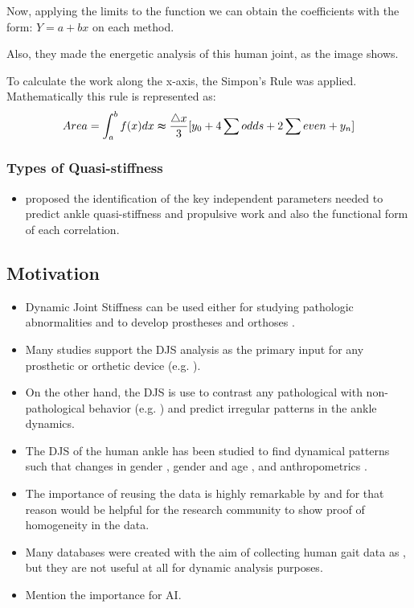 \documentclass[11pt]{article}
\providecommand{\tightlist}{%
      \setlength{\itemsep}{0pt}\setlength{\parskip}{0pt}}
\begin{document}
Now, applying the limits to the function we can obtain the coefficients
with the form: \(Y=a+bx\) on each method.

Also, they made the energetic analysis of this human joint, as the image
shows.

To calculate the work along the x-axis, the Simpon's Rule was applied.
Mathematically this rule is represented as: \begin{equation}
Area=\int_{a}^{b}f(x)dx\thickapprox\frac{\triangle x}{3}[y_{0}+4\sum odds+2\sum even+y_{n}]
\end{equation}

\hypertarget{types-of-quasi-stiffness}{%
\subsubsection{Types of
Quasi-stiffness}\label{types-of-quasi-stiffness}}

    \begin{itemize}
\tightlist
\item
  \cite{Shamaei2013} proposed the identification of the key independent
  parameters needed to predict ankle quasi-stiffness and propulsive work
  and also the functional form of each correlation.
\end{itemize}

    \hypertarget{motivation}{%
\subsection{Motivation}\label{motivation}}

\begin{itemize}
\item
  Dynamic Joint Stiffness can be used either for studying pathologic
  abnormalities and to develop prostheses and orthoses
  \cite{Sanchis-Sales2016}.
\item
  Many studies support the DJS analysis as the primary input for any
  prosthetic or orthetic device (e.g.
  \cite{Au2009, Herr2012, Dong2017, Holgate2017}).
\end{itemize}

\begin{itemize}
\item
  On the other hand, the DJS is use to contrast any pathological with
  non-pathological behavior (e.g. \cite{Aleixo2015, Wang2012}) and
  predict irregular patterns in the ankle dynamics.
\item
  The DJS of the human ankle has been studied to find dynamical patterns
  such that changes in gender \cite{Gabriel2008}, gender and age
  \cite{Crenna2011} , and anthropometrics \cite{Powell2014}.
\item
  The importance of reusing the data is highly remarkable by
  \cite{white2013} and for that reason would be helpful for the research
  community to show proof of homogeneity in the data.
\item
  Many databases were created with the aim of collecting human gait data
  as \cite{Tirosh2010, Mandery2016, Hu2018}, but they are not useful at
  all for dynamic analysis purposes.
\item
  Mention the importance for AI.
\end{itemize}
\end{document}
